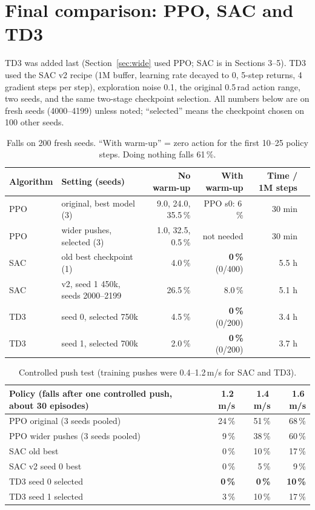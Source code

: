 \documentclass[11pt,a4paper]{article}
\begin{document}
\section{Final comparison: PPO, SAC and TD3}\label{sec:final}
TD3 was added last (Section~\ref{sec:wide} used PPO; SAC is in Sections 3--5). TD3 used the SAC v2 recipe (1M buffer, learning rate decayed to 0, 5-step returns, 4 gradient steps per step), exploration noise 0.1, the original 0.5\,rad action range, two seeds, and the same two-stage checkpoint selection. All numbers below are on fresh seeds (4000--4199) unless noted; ``selected'' means the checkpoint chosen on 100 other seeds.
\begin{table}[H]\centering\small
\begin{tabular}{@{}llrrrr@{}}
\toprule Algorithm & Setting (seeds) & No warm-up & With warm-up & Time / 1M steps\\\midrule
PPO & original, best model (3) & 9.0, 24.0, 35.5\,\% & PPO s0: 6\,\% & 30 min\\
PPO & wider pushes, selected (3) & 1.0, 32.5, 0.5\,\% & not needed & 30 min\\
SAC & old best checkpoint (1) & 4.0\,\% & \textbf{0\,\%} (0/400) & 5.5 h\\
SAC & v2, seed 1 450k, seeds 2000--2199 & 26.5\,\% & 8.0\,\% & 5.1 h\\
TD3 & seed 0, selected 750k & 4.5\,\% & \textbf{0\,\%} (0/200) & 3.4 h\\
TD3 & seed 1, selected 700k & 2.0\,\% & \textbf{0\,\%} (0/200) & 3.7 h\\\bottomrule
\end{tabular}
\caption{Falls on 200 fresh seeds. ``With warm-up'' = zero action for the first 10--25 policy steps. Doing nothing falls 61\,\%.}\end{table}
\begin{table}[H]\centering\small
\begin{tabular}{@{}lrrr@{}}
\toprule Policy (falls after one controlled push, about 30 episodes) & 1.2\,m/s & 1.4\,m/s & 1.6\,m/s\\\midrule
PPO original (3 seeds pooled) & 24\,\% & 51\,\% & 68\,\%\\
PPO wider pushes (3 seeds pooled) & 9\,\% & 38\,\% & 60\,\%\\
SAC old best & 0\,\% & 10\,\% & 17\,\%\\
SAC v2 seed 0 best & 0\,\% & 5\,\% & 9\,\%\\
TD3 seed 0 selected & \textbf{0\,\%} & \textbf{0\,\%} & \textbf{10\,\%}\\
TD3 seed 1 selected & 3\,\% & 10\,\% & 17\,\%\\\bottomrule
\end{tabular}
\caption{Controlled push test (training pushes were 0.4--1.2\,m/s for SAC and TD3).}\end{table}
\end{document}
